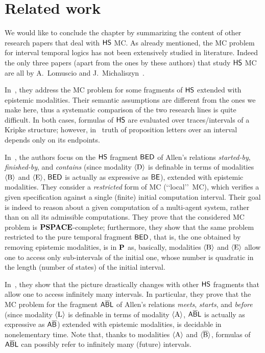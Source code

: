 \section{Related work}\label{sec:LOMrelated}
We would like to conclude the chapter by summarizing the content of other research papers that deal with $\text{\sffamily HS}$ MC.
As already mentioned, the MC problem for interval temporal logics has not been extensively studied in literature. Indeed the only three papers (apart from the ones by these authors) that study $\text{\sffamily HS}$ MC are all by A.\ Lomuscio and J.\ Michaliszyn~\cite{LM13,LM14,lm16}.

In~\cite{LM13,LM14,lm16}, they address the MC problem for some fragments of $\text{\sffamily HS}$ extended with epistemic modalities. Their semantic assumptions are different from the ones we make here, thus 
a systematic comparison of the two research lines is quite difficult. In both cases, formulas of $\text{\sffamily HS}$ are evaluated over traces/intervals of a Kripke structure; however, in~\cite{LM13,LM14} truth of proposition letters over an interval depends only on its endpoints. 

In~\cite{LM13}, the authors focus on the $\text{\sffamily HS}$ fragment $\mathsf{B}\mathsf{E}\mathsf{D}$ of Allen's relations \emph{started-by}, \emph{finished-by}, and \emph{contains} (since modality $\operatorname{\langle D\rangle}$ is definable in terms of modalities $\operatorname{\langle B\rangle}$ and $\operatorname{\langle E\rangle}$, $\mathsf{B}\mathsf{E}\mathsf{D}$ is actually as expressive as $\mathsf{BE}$), extended with epistemic modalities. They consider a \emph{restricted} form of MC (\lq\lq local\rq\rq\ MC), which verifies a given specification against a single (finite) initial computation interval. Their goal is indeed to reason about a given computation of a multi-agent system, rather than on all its admissible computations.
They prove that the considered MC problem is $\textbf{PSPACE}$-complete; furthermore, they show that the same problem restricted to the pure temporal fragment $\mathsf{B}\mathsf{E}\mathsf{D}$, that is, the one obtained by removing epistemic modalities, is in $\textbf{P}$ as, basically, modalities $\operatorname{\langle B\rangle}$ and $\operatorname{\langle E\rangle}$ allow one to access only sub-intervals of the initial one, whose number is quadratic in the length (number of states) of the initial interval.

In~\cite{LM14}, they show that the picture drastically changes with other $\text{\sffamily HS}$ fragments that allow one to access infinitely many intervals. In particular, they prove that the MC problem for the fragment $\mathsf{A\overline{B}}\mathsf{L}$ of Allen's relations \emph{meets}, \emph{starts}, and \emph{before} (since modality $\operatorname{\langle L\rangle}$ is definable in terms of modality $\operatorname{\langle A\rangle}$, $\mathsf{A\overline{B}}\mathsf{L}$ is actually as expressive as $\mathsf{A\overline{B}}$) extended with epistemic modalities, is decidable in nonelementary time. Note that, thanks to modalities $\operatorname{\langle A\rangle}$ and $\operatorname{\langle \overline{B}\rangle}$, formulas of $\mathsf{A\overline{B}}\mathsf{L}$ can possibly refer to infinitely many (future) intervals.

